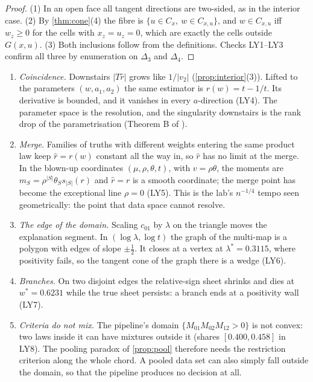 \documentclass[11pt]{article}
\theoremstyle{definition}\newtheorem{definition}[theorem]{Definition}\newtheorem{remark}[theorem]{Remark}\newtheorem{example}[theorem]{Example}
\begin{document}
\begin{proof}
(1) In an open face all tangent directions are two-sided, as in the interior case. (2) By \cref{thm:cone}(4) the fibre is
$\{u\in C_x,\ w\in C_{x,u}\}$, and $w\in C_{x,u}$ iff $w_z\ge0$ for the cells with $x_z=u_z=0$, which are exactly the cells outside
$G(x,u)$. (3) Both inclusions follow from the definitions. Checks LY1--LY3 confirm all three by enumeration on $\Delta_3$ and $\Delta_4$.
\end{proof}

\begin{proposition}\label{prop:layers}
\begin{enumerate}
\item[(1)] \emph{Coincidence.} Downstairs $|T\hat r|$ grows like $1/|v_2|$ (\cref{prop:interior}(3)). Lifted to the parameters
  $(w,a_1,a_2)$ the same estimator is $r(w)=t-1/t$. Its derivative is bounded, and it vanishes in every $a$-direction (LY4). The parameter
  space is the resolution, and the singularity downstairs is the rank drop of the parametrisation (Theorem B of \cite{Lab}).
\item[(2)] \emph{Merge.} Families of truths with different weights entering the same product law keep $\hat r=r(w)$ constant all the way
  in, so $\hat r$ has no limit at the merge. In the blown-up coordinates $(\mu,\rho,\theta,t)$, with $v=\rho\theta$, the moments are
  $m_S=\rho^{|S|}\theta_Ss_{|S|}(r)$ and $\hat r=r$ is a smooth coordinate; the merge point has become the exceptional line $\rho=0$ (LY5).
  This is the lab's $n^{-1/4}$ tempo seen geometrically: the point that data space cannot resolve.
\item[(3)] \emph{The edge of the domain.} Scaling $c_{01}$ by $\lambda$ on the triangle moves the explanation segment. In $(\log\lambda,\log t)$
  the graph of the multi-map is a polygon with edges of slope $\pm\tfrac12$. It closes at a vertex at $\lambda^*=0.3115$, where
  positivity fails, so the tangent cone of the graph there is a wedge (LY6).
\item[(4)] \emph{Branches.} On two disjoint edges the relative-sign sheet shrinks and dies at $w^*=0.6231$ while the true sheet persists:
  a branch ends at a positivity wall (LY7).
\item[(5)] \emph{Criteria do not mix.} The pipeline's domain $\{M_{01}M_{02}M_{12}>0\}$ is not convex: two laws inside it can have
  mixtures outside it (shares $[0.400,0.458]$ in LY8). The pooling paradox of \cref{prop:pool} therefore needs the restriction criterion
  along the whole chord. A pooled data set can also simply fall outside the domain, so that the pipeline produces no decision at all.
\end{enumerate}
\end{proposition}
\end{document}
